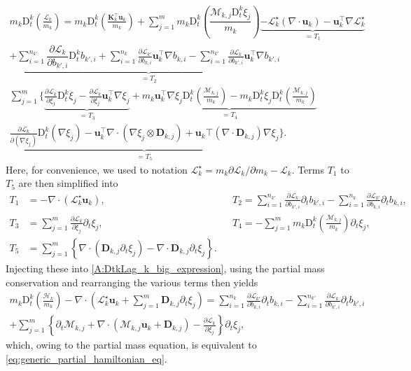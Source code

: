 \documentclass{myclass}
\newcommand{\Lag}{\mathscr{L}}
\newcommand{\Ham}{\mathcal{H}}
\newcommand{\Dt}{\mathrm{D}_t}
\newcommand{\vel}{\bm{u}}
\newcommand{\pth}[1]  {\left( #1 \right)}
\newcommand{\acco}[1]{\left\{ #1 \right\}}
\begin{document}
\begin{multline}\label{A:DtkLag_k_big_expression}
m_k\Dt^k\pth{\frac{\Lag_k}{m_k}} = m_k\Dt^k\pth{\frac{\bm{K}_k^\top\vel_k}{m_k}} + \sum_{j=1}^{m}m_k\Dt^k\pth{\dfrac{\mathscr{M}_{k,j}\Dt^k\xi_j}{m_k}} \underbrace{- \Lag_k^\star\pth{\nabla\cdot\vel_k} - \vel_k^\top\nabla\Lag_k^\star}_{=T_1}\\
+\underbrace{\sum_{i=1}^{n_{k'}}\dfrac{\partial\Lag_k}{\partial b_{k',i}}\Dt^k b_{k',i} + \sum_{i=1}^{n_k}\frac{\partial\Lag_{k'}}{\partial b_{k,i}}\vel_k^\top\nabla b_{k,i} -  \sum_{i=1}^{n_{k'}}\frac{\partial\Lag_{k}}{\partial b_{k',i}}\vel_k^\top\nabla b_{k',i} }_{=T_2}\\
\sum_{j=1}^{m}\bigg\{
 \underbrace{\frac{\partial\Lag_k}{\partial\xi_j}\Dt^k\xi_j - \frac{\partial\Lag_k}{\partial\xi_j}\vel_k^\top\nabla\xi_j }_{=T_3 }
+ \underbrace{ m_k\vel_k^\top\nabla\xi_j \Dt^k\pth{\frac{\mathscr{M}_{k,j}}{m_k}}-m_k\Dt^k\xi_j\Dt^k\pth{\frac{\mathscr{M}_{k,j}}{m_k}} }_{=T_4} \\
 \underbrace{\frac{\partial\Lag_k}{\partial\pth{\nabla\xi_j}}\Dt^k\pth{\nabla\xi_j} - \vel_k^\top\nabla\cdot\pth{\nabla\xi_j\otimes\bm{D}_{k,j}} + \vel_k\top\pth{\nabla\cdot\bm{D}_{k,j}}\nabla\xi_j }_{=T_5}
\bigg\}.
\end{multline}
Here, for convenience, we used to notation $\Lag_k^\star = m_k\partial\Lag_k/\partial m_k - \Lag_k$. Terms $T_1$ to $T_5$ are then simplified into
\begin{subequations}
\begin{align}
T_1 &= - \nabla\cdot\pth{\Lag_k^\star\vel_k}, && T_2 = \sum_{i=1}^{n_{k'}}\frac{\partial\Lag_k}{\partial b_{k',i}}\partial_t b_{k',i} - \sum_{i=1}^{n_{k}}\frac{\partial\Lag_{k'}}{\partial b_{k,i}}\partial_t b_{k,i} ,\\
T_3 &= \sum_{j=1}^{m}\frac{\partial\Lag_k}{\partial\xi_j}\partial_t\xi_j, && T_4=-\sum_{j=1}^{m}m_k\Dt^k\pth{\frac{\mathscr{M}_{k,j}}{m_k}}\partial_t\xi_j,\\
T_5 &= \sum_{j=1}^{m}\acco{\nabla\cdot\pth{\bm{D}_{k,j}\partial_t\xi_j} - \nabla\cdot\bm{D}_{k,j}\partial_t\xi_j}.
\end{align}
\end{subequations}
Injecting these into \eqref{A:DtkLag_k_big_expression}, using the partial mass conservation and rearranging the various terms then yields
\begin{multline}
m_k\Dt^k\pth{\frac{\Ham_k}{m_k}} -\nabla\cdot\pth{\Lag_k^\star\vel_k + \sum_{j=1}^{m}\bm{D}_{k,j}\partial_t\xi_j} = \sum_{i=1}^{n_{k}}\frac{\partial\Lag_{k'}}{\partial b_{k,i}}\partial_t b_{k,i} - \sum_{i=1}^{n_{k'}}\frac{\partial\Lag_k}{\partial b_{k',i}}\partial_t b_{k',i} \\
+\sum_{j=1}^{m}\acco{\partial_t\mathscr{M}_{k,j} + \nabla\cdot\pth{\mathscr{M}_{k,j}\vel_k + \bm{D}_{k,j}} - \frac{\partial\Lag_k}{\partial\xi_j}}\partial_t\xi_j,
\end{multline}
which, owing to the partial mass equation, is equivalent to \eqref{eq:generic_partial_hamiltonian_eq}.
\end{document}
